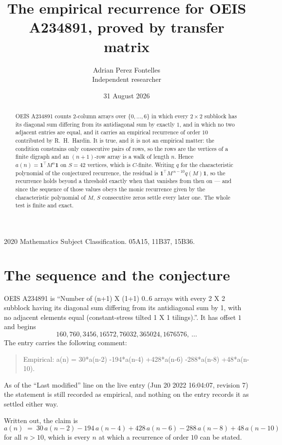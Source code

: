 \documentclass[11pt,a4paper]{article}
\title{The empirical recurrence for OEIS A234891, proved by transfer matrix}
\author{Adrian Perez Fontelles\\ \small Independent researcher}
\date{31 August 2026}
\theoremstyle{plain}
\theoremstyle{definition}
\begin{document}
\maketitle

\begin{abstract}
OEIS A234891 counts $2$-column arrays over $\{0,\dots,6\}$ in which every
$2\times2$ subblock has its diagonal sum differing from its antidiagonal sum by
exactly $1$, and in which no two adjacent entries are equal, and it
carries an empirical recurrence of order $10$ contributed by R.~H.~Hardin. It is true,
and it is not an empirical matter: the condition constrains only consecutive pairs of rows,
so the rows are the vertices of a finite digraph and an $(n+1)$-row array is a walk of
length $n$. Hence $a(n)=\mathbf{1}^{\!\top}M^{n}\mathbf{1}$ on $S=42$ vertices, which
is $C$-finite. Writing $q$ for the characteristic polynomial of the conjectured recurrence,
the residual is $\mathbf{1}^{\!\top}M^{\,n-10}q(M)\mathbf{1}$, so the recurrence
holds beyond a threshold exactly when that vanishes from then on --- and since the sequence
of those values obeys the monic recurrence given by the characteristic polynomial of $M$,
$S$ consecutive zeros settle every later one. The whole test is finite and exact.
\end{abstract}

\noindent\small 2020 Mathematics Subject Classification. 05A15, 11B37, 15B36.\normalsize

\section{The sequence and the conjecture}

OEIS A234891 is ``Number of (n+1) X (1+1) 0..6 arrays with every 2 X 2 subblock having its diagonal sum differing from its antidiagonal sum by 1, with no adjacent elements equal (constant-stress tilted 1 X 1 tilings).''. It has offset
$1$ and begins
\[
160, 760, 3456, 16572, 76032, 365024, 1676576,\ \dots
\]
The entry carries the following comment:
\begin{quote}\small
Empirical: a(n) = 30*a(n-2) -194*a(n-4) +428*a(n-6) -288*a(n-8) +48*a(n-10).
\end{quote}
As of the ``Last modified'' line on the live entry (Jun 20 2022 16:04:07, revision 7) the statement is
still recorded as empirical, and nothing on the entry records it as settled either way.

Written out, the claim is
\begin{equation}\label{eq:conj}
a(n)\;=\;30\,a(n-2) - 194\,a(n-4) + 428\,a(n-6) - 288\,a(n-8) + 48\,a(n-10)
\end{equation}
for all $n>10$, which is every $n$ at which a recurrence of order $10$ can be
stated.
\end{document}

